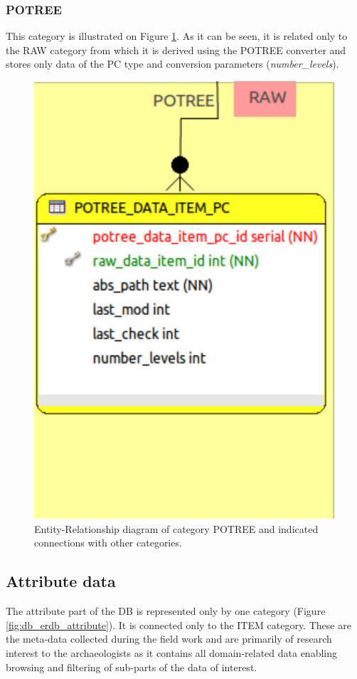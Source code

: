\subsubsection{POTREE}
This category is illustrated on Figure \ref{fig:db_erdb_potree}. As it can be seen, it is related only to the RAW category from which it is derived using the POTREE converter and stores only data of the PC type and conversion parameters ({\em number\_levels}).
\begin{figure}[!H]
\centering
\includegraphics[scale=0.35]{fig/database/ERDB_POTREE_conn.pdf}
\caption{Entity-Relationship diagram of category POTREE and indicated connections with other categories.}
\label{fig:db_erdb_potree}
\end{figure}

\subsection{Attribute data}
The attribute part of the DB is represented only by one category (Figure \ref{fig:db_erdb_attribute}). It  is connected only to the ITEM category. These are the meta-data collected during the field work and are primarily of research interest to the archaeologists as it contains all domain-related data enabling browsing and filtering of sub-parts of the data of interest.

